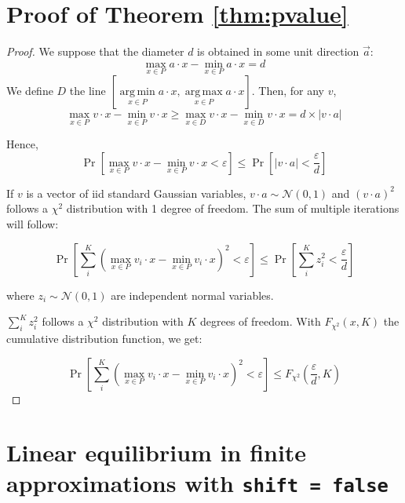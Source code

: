 \documentclass[preprint,12pt,authoryear]{elsarticle}
\theoremstyle{definition}
\DeclareMathOperator*{\argmax}{arg\,max}
\DeclareMathOperator*{\argmin}{arg\,min}
\begin{document}
\section{Proof of Theorem \ref{thm:pvalue}}
\pvalue*
\begin{proof}
    We suppose that the diameter $d$ is obtained in some unit direction $\vec a$: $$\max \limits_{x\in P}a \cdot x - \min \limits_{x\in P}a \cdot x = d$$
    We define $D$ the line $\left[\argmin \limits_{x\in P}a \cdot x, \argmax \limits_{x\in P}a \cdot x\right]$.
    Then, for any $v$, $$\max \limits_{x\in P}v \cdot x - \min \limits_{x\in P}v \cdot x \ge \max \limits_{x\in D}v \cdot x - \min \limits_{x\in D}v \cdot x = d \times |v \cdot a|$$

Hence, $$\Pr\left[ \max \limits_{x\in P}v \cdot x - \min \limits_{x\in P}v \cdot x < \varepsilon \right] \le \Pr\left[ |v \cdot a| < \frac{\varepsilon}{d} \right]$$



If $v$ is a vector of iid standard Gaussian variables, $v \cdot a \sim \mathcal{N}(0, 1)$ and $(v \cdot a)^2$ follows a $\chi^2$ distribution with 1 degree of freedom.
The sum of multiple iterations will follow:

$$\Pr\left[\sum_i^K (\max \limits_{x\in P}v_i \cdot x - \min \limits_{x\in P}v_i \cdot x)^2 < \varepsilon \right] \le \Pr\left[ \sum_i^K z_i^2 < \frac{\varepsilon}{d} \right]$$

where $z_i \sim \mathcal{N}(0, 1)$ are independent normal variables.

$\sum_i^K z_i^2$ follows a $\chi^2$ distribution with $K$ degrees of freedom. With $F_{\chi^2}(x, K)$ the cumulative distribution function, we get:

$$\Pr\left[\sum_i^K (\max \limits_{x\in P}v_i \cdot x - \min \limits_{x\in P}v_i \cdot x)^2 < \varepsilon \right] \le F_{\chi^2}\left(\frac{\varepsilon}{d}, K\right)$$
\end{proof}

\section{Linear equilibrium in finite approximations with \texttt{shift~=~false}}
\label{sec:linear-noshift}

\begin{figure}[H]
  \centering
  \begin{minipage}[t]{0.48\textwidth}
    \centering
    
  \end{minipage}
  \hfill
  \begin{minipage}[t]{0.48\textwidth}
    \centering
    
  \end{minipage}
\end{figure}







\end{document}
